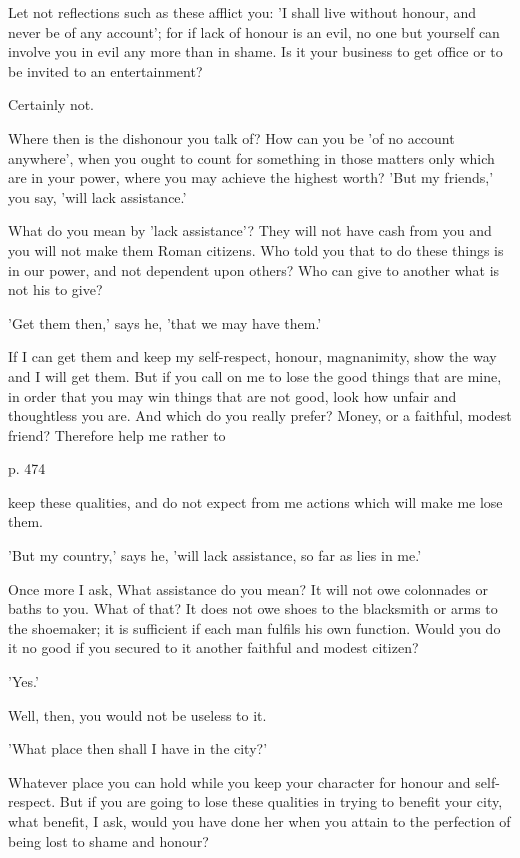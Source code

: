 Let not  reflections such as these  afflict you: 'I shall  live without honour,
and never  be of any  account'; for if  lack of honour is  an evil, no  one but
yourself can involve you in evil any more than in shame. Is it your business to
get office or to be invited to an entertainment?

Certainly not.

Where  then is  the  dishonour you  talk  of? How  can you  be  'of no  account
anywhere', when  you ought to count  for something in those  matters only which
are in your power,  where you may achieve the highest  worth? 'But my friends,'
you say, 'will lack assistance.'

What do you mean by 'lack assistance'? They will not have cash from you and you
will not make them  Roman citizens. Who told you that to do  these things is in
our power, and not  dependent upon others? Who can give to  another what is not
his to give?

'Get them then,' says he, 'that we may have them.'

If I can get  them and keep my self-respect, honour,  magnanimity, show the way
and I will  get them. But if  you call on me  to lose the good  things that are
mine, in order that  you may win things that are not good,  look how unfair and
thoughtless you  are. And  which do  you really prefer?  Money, or  a faithful,
modest friend? Therefore help me rather to

p. 474

keep these qualities, and do not expect from me actions which will make me lose
them.

'But my country,' says he, 'will lack assistance, so far as lies in me.'

Once more  I ask, What assistance  do you mean?  It will not owe  colonnades or
baths to you. What of that? It does  not owe shoes to the blacksmith or arms to
the shoemaker; it is sufficient if each man fulfils his own function. Would you
do it no good if you secured to it another faithful and modest citizen?

'Yes.'

Well, then, you would not be useless to it.

'What place then shall I have in the city?'

Whatever  place you  can hold  while  you keep  your character  for honour  and
self-respect. But if you are going to lose these qualities in trying to benefit
your city, what benefit, I ask, would you  have done her when you attain to the
perfection of being lost to shame and honour?
